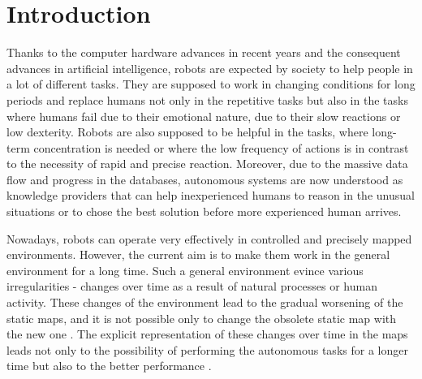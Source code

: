 \section{Introduction}

Thanks to the computer hardware advances in recent years and the consequent advances in artificial intelligence, robots are expected by society to help people in a lot of different tasks.
They are supposed to work in changing conditions for long periods and replace humans not only in the repetitive tasks but also in the tasks where humans fail due to their emotional nature, due to their slow reactions or low dexterity.
Robots are also supposed to be helpful in the tasks, where long-term concentration is needed or where the low frequency of actions is in contrast to the necessity of rapid and precise reaction.
Moreover, due to the massive data flow and progress in the databases, autonomous systems are now understood as knowledge providers that can help inexperienced humans to reason in the unusual situations or to chose the best solution before more experienced human arrives.

Nowadays, robots can operate very effectively in controlled and precisely mapped environments.
However, the current aim is to make them work in the general environment for a long time.
Such a general environment evince various irregularities - changes over time as a result of natural processes or human activity.
These changes of the environment lead to the gradual worsening of the static maps, and it is not possible only to change the obsolete static map with the new one \cite{Dayoub2009adaptive}.
The explicit representation of these changes over time in the maps leads not only to the possibility of performing the autonomous tasks for a longer time 
\cite{biber2009experimental,tipaldi2013lifelong,kucner2013conditional,krajnik2017fremen,churchill2013experience,konolige2009towards,hochdorfer2009towards}
 but also to the better performance 
\cite{hawes2017strands,santos2016lifelong,kunze2018artificial,santos2017spatio,hanheide2017and}.

